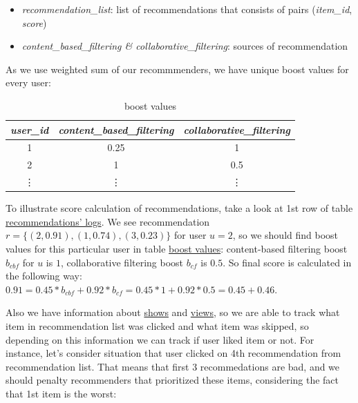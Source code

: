\documentclass{article}
\begin{document}
    \begin{itemize}
        \item \textit{recommendation\_list}: list of recommendations that consists of pairs (\textit{item\_id}, \textit{score})
        \item \textit{content\_based\_filtering \& collaborative\_filtering}: sources of recommendation
    \end{itemize}

    As we use weighted sum of our recommmenders, we have unique boost values for every user:

    \begin{table}[h]
        \centering
        \begin{tabular}{ccc}
            \toprule
            \textit{user\_id} & \textit{content\_based\_filtering} & \textit{collaborative\_filtering} \\
            \midrule
            1                 & 0.25                                  & 1                               \\
            2                 & 1                               & 0.5                                \\
            \vdots & \vdots & \vdots \\
            \bottomrule
            \end{tabular}%
        \caption{boost values}
        \label{tab:boost_values}
    \end{table}

    To illustrate score calculation of recommendations, take a look at 1st row of table \hyperref[tab:recommendation_logs]{recommendations' logs}. We see recommendation $r = \{(2, 0.91), (1, 0.74), (3, 0.23)\}$ for user $u = 2$, so we should find boost values for this particular user in table \hyperref[tab:boost_values]{boost values}: content-based filtering boost $b_{cbf}$ for $u$ is $1$, collaborative filtering boost $b_{cf}$ is $0.5$. So final score is calculated in the following way: $0.91 = 0.45 * b_{cbf} + 0.92 * b_{cf} = 0.45 * 1 + 0.92 * 0.5 = 0.45 + 0.46$.

    Also we have information about \hyperref[tab:show]{shows} and \hyperref[tab:view]{views}, so we are able to track what item in recommendation list was clicked and what item was skipped, so depending on this information we can track if user liked item or not. For instance, let's consider situation that user clicked on 4th recommendation from recommendation list. That means that first 3 recommedations are bad, and we should penalty recommenders that prioritized these items, considering the fact that 1st item is the worst:
\end{document}
